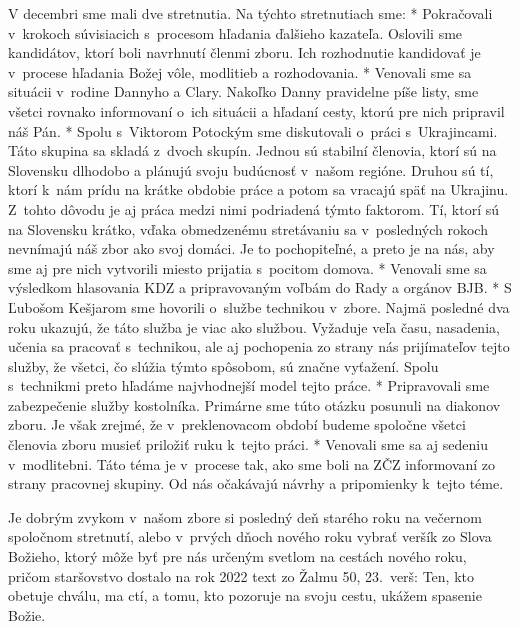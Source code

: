 V decembri sme mali dve stretnutia. Na týchto stretnutiach sme:
\begitems
* Pokračovali v~krokoch súvisiacich s~procesom hľadania ďalšieho kazateľa. Oslovili sme kandidátov, ktorí boli navrhnutí členmi zboru. Ich rozhodnutie kandidovať je v~procese hľadania Božej vôle, modlitieb a rozhodovania.
* Venovali sme sa situácii v~rodine Dannyho a Clary. Nakoľko Danny pravidelne píše listy, sme všetci rovnako informovaní o~ich situácii a hľadaní cesty, ktorú pre nich pripravil náš Pán.
* Spolu s~Viktorom Potockým sme diskutovali o~práci s~Ukrajincami. Táto skupina sa skladá z~dvoch skupín. Jednou sú stabilní členovia, ktorí sú na Slovensku dlhodobo a plánujú svoju budúcnosť v~našom regióne. Druhou sú tí, ktorí k~nám prídu na krátke obdobie práce a potom sa vracajú späť na Ukrajinu. Z~tohto dôvodu je aj práca medzi nimi podriadená týmto faktorom. Tí, ktorí sú na Slovensku krátko, vďaka obmedzenému stretávaniu sa v~posledných rokoch nevnímajú náš zbor ako svoj domáci. Je to pochopiteľné, a preto je na nás, aby sme aj pre nich vytvorili miesto prijatia s~pocitom domova.
* Venovali sme sa výsledkom hlasovania KDZ a pripravovaným voľbám do Rady a orgánov BJB.
* S Ľubošom Kešjarom sme hovorili o~službe technikou v~zbore. Najmä posledné dva roku ukazujú, že táto služba je viac ako službou. Vyžaduje veľa času, nasadenia, učenia sa pracovať s~technikou, ale aj pochopenia zo strany nás prijímateľov tejto služby, že všetci, čo slúžia týmto spôsobom, sú značne vyťažení. Spolu s~technikmi preto hľadáme najvhodnejší model tejto práce.
* Pripravovali sme zabezpečenie služby kostolníka. Primárne sme túto otázku posunuli na diakonov zboru. Je však zrejmé, že v~preklenovacom období budeme spoločne všetci členovia zboru musieť priložiť ruku k~tejto práci.
* Venovali sme sa aj sedeniu v~modlitebni. Táto téma je v~procese tak, ako sme boli na ZČZ informovaní zo strany pracovnej skupiny. Od nás očakávajú návrhy a pripomienky k~tejto téme.
\enditems




Je dobrým zvykom v~našom zbore si posledný deň starého roku na večernom spoločnom stretnutí, alebo v~prvých dňoch nového roku vybrať veršík zo Slova Božieho, ktorý môže byť pre nás určeným svetlom na cestách nového roku, pričom staršovstvo dostalo na rok 2022 text zo Žalmu 50, 23.~verš: Ten, kto obetuje chválu, ma ctí, a tomu, kto pozoruje na svoju cestu, ukážem spasenie Božie.


